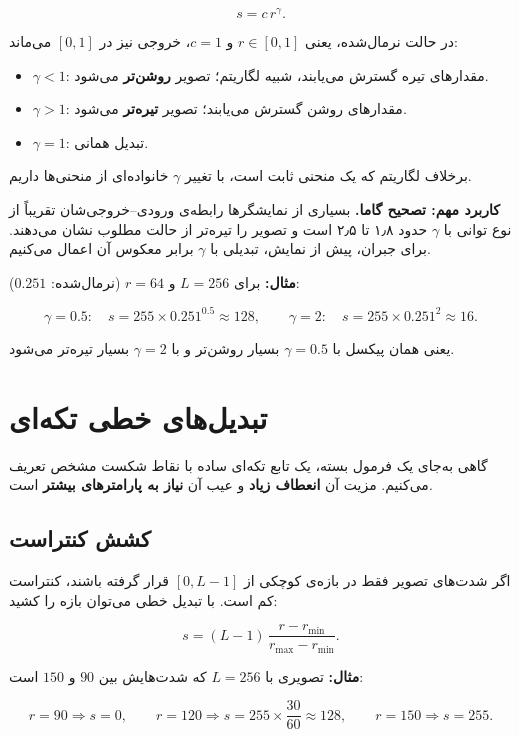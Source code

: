 \documentclass[11pt,a4paper]{article}
\begin{document}
	\[
	s=c\,r^{\gamma}.
	\]
	
	در حالت نرمال‌شده، یعنی $r\in[0,1]$ و $c=1$، خروجی نیز در $[0,1]$ می‌ماند:
	
	\begin{itemize}
		\item $\gamma<1$: مقدارهای تیره گسترش می‌یابند، شبیه لگاریتم؛ تصویر \textbf{روشن‌تر} می‌شود.
		\item $\gamma>1$: مقدارهای روشن گسترش می‌یابند؛ تصویر \textbf{تیره‌تر} می‌شود.
		\item $\gamma=1$: تبدیل همانی.
	\end{itemize}
	
	برخلاف لگاریتم که یک منحنی ثابت است، با تغییر $\gamma$ خانواده‌ای از منحنی‌ها داریم.
	
	\textbf{کاربرد مهم: تصحیح گاما.} بسیاری از نمایشگرها رابطه‌ی ورودی--خروجی‌شان تقریباً از نوع
	توانی با $\gamma$ حدود ۱٫۸ تا ۲٫۵ است و تصویر را تیره‌تر از حالت مطلوب نشان می‌دهند.
	برای جبران، پیش از نمایش، تبدیلی با $\gamma$ برابر معکوس آن اعمال می‌کنیم.
	
	\textbf{مثال:} برای $L=256$ و $r=64$ (نرمال‌شده: $0.251$):
	
	\[
	\gamma=0.5:\quad s=255\times0.251^{0.5}\approx128,
	\qquad
	\gamma=2:\quad s=255\times0.251^{2}\approx16.
	\]
	
	یعنی همان پیکسل با $\gamma=0.5$ بسیار روشن‌تر و با $\gamma=2$ بسیار تیره‌تر می‌شود.
	
	
	\section{تبدیل‌های خطی تکه‌ای}
	
	گاهی به‌جای یک فرمول بسته، یک تابع تکه‌ای ساده با نقاط شکست مشخص تعریف می‌کنیم.
	مزیت آن \textbf{انعطاف زیاد} و عیب آن \textbf{نیاز به پارامترهای بیشتر} است.
	
	\subsection{کشش کنتراست}
	
	اگر شدت‌های تصویر فقط در بازه‌ی کوچکی از $[0,L-1]$ قرار گرفته باشند،
	کنتراست کم است. با تبدیل خطی می‌توان بازه را کشید:
	
	\[
	s=(L-1)\,\frac{r-r_{\min}}{r_{\max}-r_{\min}}.
	\]
	
	\textbf{مثال:} تصویری با $L=256$ که شدت‌هایش بین $90$ و $150$ است:
	
	\[
	r=90\Rightarrow s=0,
	\qquad
	r=120\Rightarrow s=255\times\frac{30}{60}\approx128,
	\qquad
	r=150\Rightarrow s=255.
	\]
	
\end{document}
